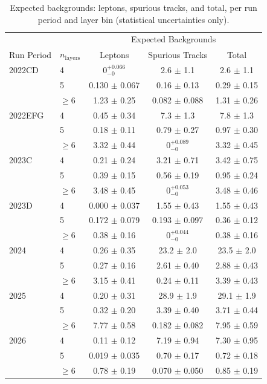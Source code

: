 \begin{table}[htbp]
\centering
\caption{Expected backgrounds: leptons, spurious tracks, and total, per run period and layer bin (statistical uncertainties only).}
\label{tab:total_background_estimate}
\begin{tabular}{llccc}
\hline
 & & \multicolumn{3}{c}{Expected Backgrounds} \\
Run Period & $n_{\mathrm{layers}}$ & Leptons & Spurious Tracks & Total \\
\hline
2022CD & 4 & $0^{+0.066}_{-0}$ & 2.6 $\pm$ 1.1 & 2.6 $\pm$ 1.1 \\
 & 5 & 0.130 $\pm$ 0.067 & 0.16 $\pm$ 0.13 & 0.29 $\pm$ 0.15 \\
 & $\geq 6$ & 1.23 $\pm$ 0.25 & 0.082 $\pm$ 0.088 & 1.31 $\pm$ 0.26 \\
\hline
2022EFG & 4 & 0.45 $\pm$ 0.34 & 7.3 $\pm$ 1.3 & 7.8 $\pm$ 1.3 \\
 & 5 & 0.18 $\pm$ 0.11 & 0.79 $\pm$ 0.27 & 0.97 $\pm$ 0.30 \\
 & $\geq 6$ & 3.32 $\pm$ 0.44 & $0^{+0.089}_{-0}$ & 3.32 $\pm$ 0.45 \\
\hline
2023C & 4 & 0.21 $\pm$ 0.24 & 3.21 $\pm$ 0.71 & 3.42 $\pm$ 0.75 \\
 & 5 & 0.39 $\pm$ 0.15 & 0.56 $\pm$ 0.19 & 0.95 $\pm$ 0.24 \\
 & $\geq 6$ & 3.48 $\pm$ 0.45 & $0^{+0.053}_{-0}$ & 3.48 $\pm$ 0.46 \\
\hline
2023D & 4 & 0.000 $\pm$ 0.037 & 1.55 $\pm$ 0.43 & 1.55 $\pm$ 0.43 \\
 & 5 & 0.172 $\pm$ 0.079 & 0.193 $\pm$ 0.097 & 0.36 $\pm$ 0.12 \\
 & $\geq 6$ & 0.38 $\pm$ 0.16 & $0^{+0.044}_{-0}$ & 0.38 $\pm$ 0.16 \\
\hline
2024 & 4 & 0.26 $\pm$ 0.35 & 23.2 $\pm$ 2.0 & 23.5 $\pm$ 2.0 \\
 & 5 & 0.27 $\pm$ 0.16 & 2.61 $\pm$ 0.40 & 2.88 $\pm$ 0.43 \\
 & $\geq 6$ & 3.15 $\pm$ 0.41 & 0.24 $\pm$ 0.11 & 3.39 $\pm$ 0.43 \\
\hline
2025 & 4 & 0.20 $\pm$ 0.31 & 28.9 $\pm$ 1.9 & 29.1 $\pm$ 1.9 \\
 & 5 & 0.32 $\pm$ 0.20 & 3.39 $\pm$ 0.40 & 3.71 $\pm$ 0.44 \\
 & $\geq 6$ & 7.77 $\pm$ 0.58 & 0.182 $\pm$ 0.082 & 7.95 $\pm$ 0.59 \\
\hline
2026 & 4 & 0.11 $\pm$ 0.12 & 7.19 $\pm$ 0.94 & 7.30 $\pm$ 0.95 \\
 & 5 & 0.019 $\pm$ 0.035 & 0.70 $\pm$ 0.17 & 0.72 $\pm$ 0.18 \\
 & $\geq 6$ & 0.78 $\pm$ 0.19 & 0.070 $\pm$ 0.050 & 0.85 $\pm$ 0.19 \\
\hline
\end{tabular}
\end{table}
